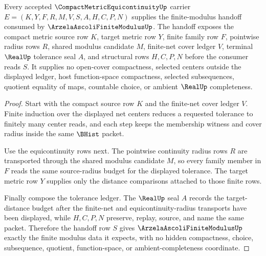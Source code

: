 \begin{theorem}
\label{thm:compact-metric-equicontinuity-ascoli}
Every accepted $\CompactMetricEquicontinuityUp$ carrier $E=(K,Y,F,R,M,V,S,A,H,C,P,N)$ supplies the finite-modulus handoff consumed by $\ArzelaAscoliFiniteModulusUp$. The handoff exposes the compact metric source row $K$, target metric row $Y$, finite family row $F$, pointwise radius rows $R$, shared modulus candidate $M$, finite-net cover ledger $V$, terminal $\RealUp$ tolerance seal $A$, and structural rows $H,C,P,N$ before the consumer reads $S$. It supplies no open-cover compactness, selected centers outside the displayed ledger, host function-space compactness, selected subsequences, quotient equality of maps, countable choice, or ambient $\RealUp$ completeness.
\end{theorem}
\begin{proof}
Start with the compact source row $K$ and the finite-net cover ledger $V$. Finite induction over the displayed net centers reduces a requested tolerance to finitely many center reads, and each step keeps the membership witness and cover radius inside the same $\BHist$ packet.

Use the equicontinuity rows next. The pointwise continuity radius rows $R$ are transported through the shared modulus candidate $M$, so every family member in $F$ reads the same source-radius budget for the displayed tolerance. The target metric row $Y$ supplies only the distance comparisons attached to those finite rows.

Finally compose the tolerance ledger. The $\RealUp$ seal $A$ records the target-distance budget after the finite-net and equicontinuity-radius transports have been displayed, while $H,C,P,N$ preserve, replay, source, and name the same packet. Therefore the handoff row $S$ gives $\ArzelaAscoliFiniteModulusUp$ exactly the finite modulus data it expects, with no hidden compactness, choice, subsequence, quotient, function-space, or ambient-completeness coordinate.
\end{proof}


